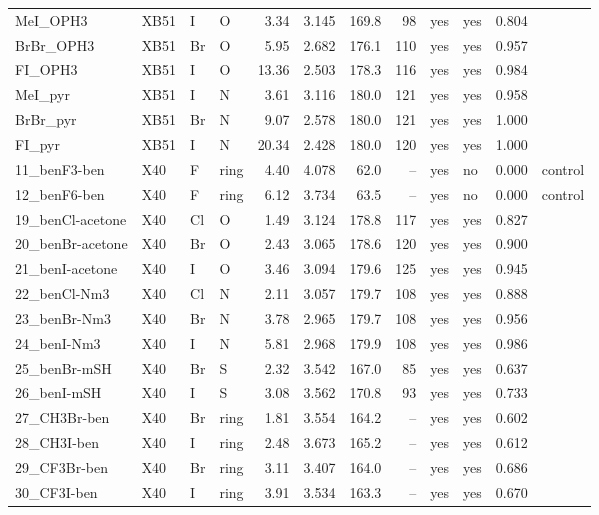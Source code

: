 {\begin{longtable}{llllrrrrllrl}
MeI\_OPH3 & XB51 & I & O & 3.34 & 3.145 & 169.8 & 98 & yes & yes & 0.804 & \\
BrBr\_OPH3 & XB51 & Br & O & 5.95 & 2.682 & 176.1 & 110 & yes & yes & 0.957 & \\
FI\_OPH3 & XB51 & I & O & 13.36 & 2.503 & 178.3 & 116 & yes & yes & 0.984 & \\
MeI\_pyr & XB51 & I & N & 3.61 & 3.116 & 180.0 & 121 & yes & yes & 0.958 & \\
BrBr\_pyr & XB51 & Br & N & 9.07 & 2.578 & 180.0 & 121 & yes & yes & 1.000 & \\
FI\_pyr & XB51 & I & N & 20.34 & 2.428 & 180.0 & 120 & yes & yes & 1.000 & \\
11\_benF3-ben & X40 & F & ring & 4.40 & 4.078 & 62.0 & -- & yes & no & 0.000 & control\\
12\_benF6-ben & X40 & F & ring & 6.12 & 3.734 & 63.5 & -- & yes & no & 0.000 & control\\
19\_benCl-acetone & X40 & Cl & O & 1.49 & 3.124 & 178.8 & 117 & yes & yes & 0.827 & \\
20\_benBr-acetone & X40 & Br & O & 2.43 & 3.065 & 178.6 & 120 & yes & yes & 0.900 & \\
21\_benI-acetone & X40 & I & O & 3.46 & 3.094 & 179.6 & 125 & yes & yes & 0.945 & \\
22\_benCl-Nm3 & X40 & Cl & N & 2.11 & 3.057 & 179.7 & 108 & yes & yes & 0.888 & \\
23\_benBr-Nm3 & X40 & Br & N & 3.78 & 2.965 & 179.7 & 108 & yes & yes & 0.956 & \\
24\_benI-Nm3 & X40 & I & N & 5.81 & 2.968 & 179.9 & 108 & yes & yes & 0.986 & \\
25\_benBr-mSH & X40 & Br & S & 2.32 & 3.542 & 167.0 & 85 & yes & yes & 0.637 & \\
26\_benI-mSH & X40 & I & S & 3.08 & 3.562 & 170.8 & 93 & yes & yes & 0.733 & \\
27\_CH3Br-ben & X40 & Br & ring & 1.81 & 3.554 & 164.2 & -- & yes & yes & 0.602 & \\
28\_CH3I-ben & X40 & I & ring & 2.48 & 3.673 & 165.2 & -- & yes & yes & 0.612 & \\
29\_CF3Br-ben & X40 & Br & ring & 3.11 & 3.407 & 164.0 & -- & yes & yes & 0.686 & \\
30\_CF3I-ben & X40 & I & ring & 3.91 & 3.534 & 163.3 & -- & yes & yes & 0.670 & \\
\end{longtable}}
